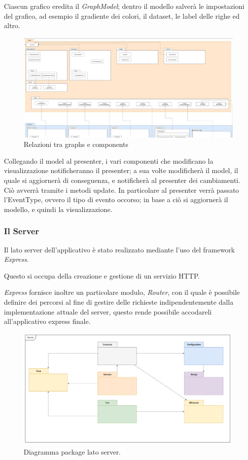 \documentclass[../manuale_sviluppatore.tex]{subfiles}
\begin{document}
Ciascun grafico eredita il \emph{GraphModel}; dentro il modello salverà le impostazioni del grafico, ad esempio il gradiente dei colori, il dataset, le label delle righe ed altro.

\begin{figure}[H]
	\centering
	\includegraphics[width=18cm]{src/img/graphs-e-components.jpg}
	\caption{Relazioni tra graphs e components}
\end{figure}


Collegando il model al presenter, i vari componenti che modificano la visualizzazione notificheranno il presenter; a sua volte modificherà il model, il quale si aggiornerà di conseguenza, 
e notificherà al presenter dei cambiamenti.
Ciò avverrà tramite i metodi update. In particolare al presenter verrà passato l'EventType, ovvero il tipo di evento occorso; in base a ciò si aggiornerà il modello, e quindi la visualizzazione.

\subsubsection{Il Server}

Il lato server dell'applicativo è stato realizzato mediante l'uso del framework \emph{Express}.

Questo si occupa della creazione e gestione di un servizio HTTP. 

\emph{Express} fornisce inoltre un particolare modulo, \emph{Router}, con il quale è possibile definire dei percorsi 
al fine di gestire delle richieste indipendentemente dalla implementazione attuale del server, questo rende possibile
accodareli all'applicativo express finale.

\begin{figure}[H]
	\centering
	\includegraphics[width=18cm]{src/img/package-server.png}
	\caption{Diagramma package lato server.}
\end{figure}
\end{document}
